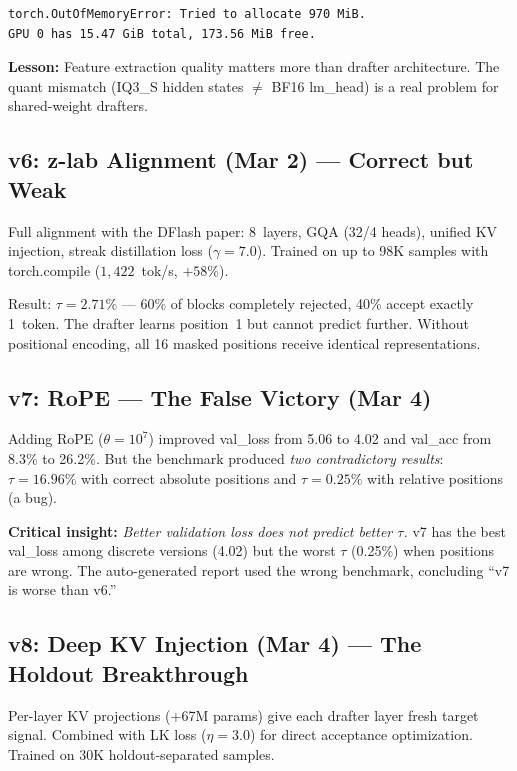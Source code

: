 \documentclass[10pt,a4paper]{article}
\begin{document}
\begin{verbatim}
torch.OutOfMemoryError: Tried to allocate 970 MiB.
GPU 0 has 15.47 GiB total, 173.56 MiB free.
\end{verbatim}

\textbf{Lesson:} Feature extraction quality matters more than drafter architecture. The quant mismatch (IQ3\_S hidden states $\neq$ BF16 lm\_head) is a real problem for shared-weight drafters.

\subsection{v6: z-lab Alignment (Mar 2) --- Correct but Weak}

Full alignment with the DFlash paper: 8~layers, GQA (32/4 heads), unified KV injection, streak distillation loss ($\gamma{=}7.0$). Trained on up to 98K samples with torch.compile ($1{,}422$~tok/s, $+58\%$).

Result: $\tau{=}2.71\%$ --- 60\% of blocks completely rejected, 40\% accept exactly 1~token. The drafter learns position~1 but cannot predict further. Without positional encoding, all 16 masked positions receive identical representations.

\subsection{v7: RoPE --- The False Victory (Mar 4)}

Adding RoPE ($\theta{=}10^7$) improved val\_loss from 5.06 to 4.02 and val\_acc from 8.3\% to 26.2\%. But the benchmark produced \emph{two contradictory results}: $\tau{=}16.96\%$ with correct absolute positions and $\tau{=}0.25\%$ with relative positions (a bug).

\textbf{Critical insight:} \emph{Better validation loss does not predict better $\tau$.} v7 has the best val\_loss among discrete versions (4.02) but the worst $\tau$ (0.25\%) when positions are wrong. The auto-generated report used the wrong benchmark, concluding ``v7 is worse than v6.''

\subsection{v8: Deep KV Injection (Mar 4) --- The Holdout Breakthrough}

Per-layer KV projections (+67M params) give each drafter layer fresh target signal. Combined with LK loss ($\eta{=}3.0$) for direct acceptance optimization. Trained on 30K holdout-separated samples.
\end{document}
